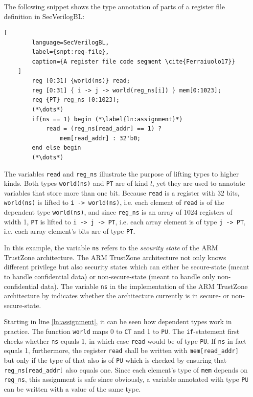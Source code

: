 \begin{example}
    The following snippet shows the type annotation of parts of a register file definition in SecVerilogBL:
    \begin{lstlisting}[
        language=SecVerilogBL,
        label={snpt:reg-file},
        caption={A register file code segment \cite{Ferraiuolo17}}
    ]
        reg [0:31] {world(ns)} read;
        reg [0:31] { i -> j -> world(reg_ns[i]) } mem[0:1023];
        reg {PT} reg_ns [0:1023];
        (*\dots*)
        if(ns == 1) begin (*\label{ln:assignment}*)
            read = (reg_ns[read_addr] == 1) ?
                mem[read_addr] : 32'b0;
        end else begin
        (*\dots*)
    \end{lstlisting}

    The variables \lstinline{read} and \lstinline{reg_ns} illustrate the purpose of lifting types to higher kinds.
    Both types \lstinline{world(ns)} and \lstinline{PT} are of kind $ l $, yet they are used to annotate variables that store more than one bit.
    Because \lstinline{read} is a register with 32 bits, \lstinline{world(ns)} is lifted to \lstinline{i -> world(ns)}, i.e. each element of \lstinline{read} is of the dependent type \lstinline{world(ns)}, and since \lstinline{reg_ns} is an array of 1024 registers of width 1, \lstinline{PT} is lifted to \lstinline{i -> j -> PT}, i.e. each array element is of type \lstinline{j -> PT}, i.e. each array element's bits are of type \lstinline{PT}.

    In this example, the variable \lstinline{ns} refers to the \textit{security state} of the ARM TrustZone architecture.
    The ARM TrustZone architecture not only knows different privilege but also security states which can either be secure-state (meant to handle confidential data) or non-secure-state (meant to handle only non-confidential data).
    The variable \lstinline{ns} in the implementation of the ARM TrustZone architecture by \citeauthor{Ferraiuolo17} indicates whether the architecture currently is in secure- or non-secure-state.

    Starting in line \ref{ln:assignment}, it can be seen how dependent types work in practice.
    The function \lstinline{world} maps 0 to \lstinline{CT} and 1 to \lstinline{PU}.
    The \lstinline{if}-statement first checks whether \lstinline{ns} equals 1, in which case \lstinline{read} would be of type \lstinline{PU}.
    If \lstinline{ns} in fact equals 1, furthermore, the register \lstinline{read} shall be written with \lstinline{mem[read_addr]} but only if the type of that also is of \lstinline{PU} which is checked by ensuring that \lstinline{reg_ns[read_addr]} also equals one.
    Since each element's type of \lstinline{mem} depends on \lstinline{reg_ns}, this assignment is safe since obviously, a variable annotated with type \lstinline{PU} can be written with a value of the same type.


\end{example}
